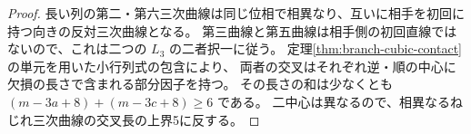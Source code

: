 \begin{proof}
長い列の第二・第六三次曲線は同じ位相で相異なり、互いに相手を初回に持つ向きの反対三次曲線となる。
第三曲線と第五曲線は相手側の初回直線ではないので、これは二つの $L_3$ の二者択一に従う。
定理\ref{thm:branch-cubic-contact}の単元を用いた小行列式の包含により、
両者の交叉はそれぞれ逆・順の中心に欠損の長さで含まれる部分因子を持つ。
その長さの和は少なくとも $(m-3a+8)+(m-3c+8)\ge6$ である。
二中心は異なるので、相異なるねじれ三次曲線の交叉長の上界5に反する。
\end{proof}

